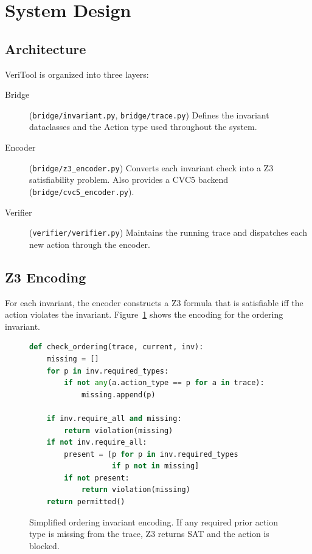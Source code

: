 \documentclass[10pt,twocolumn]{article}
\begin{document}
\section{System Design}
\label{sec:design}

\subsection{Architecture}

VeriTool is organized into three layers:

\begin{description}
\item[Bridge] (\texttt{bridge/invariant.py}, \texttt{bridge/trace.py})
  Defines the invariant dataclasses and the Action type used throughout
  the system.
\item[Encoder] (\texttt{bridge/z3\_encoder.py}) Converts each invariant
  check into a Z3 satisfiability problem. Also provides a CVC5 backend
  (\texttt{bridge/cvc5\_encoder.py}).
\item[Verifier] (\texttt{verifier/verifier.py}) Maintains the running
  trace and dispatches each new action through the encoder.
\end{description}

\subsection{Z3 Encoding}

For each invariant, the encoder constructs a Z3 formula that is satisfiable
iff the action violates the invariant. Figure~\ref{fig:encoding} shows
the encoding for the ordering invariant.

\begin{figure}[t]
\begin{lstlisting}[language=Python]
def check_ordering(trace, current, inv):
    missing = []
    for p in inv.required_types:
        if not any(a.action_type == p for a in trace):
            missing.append(p)

    if inv.require_all and missing:
        return violation(missing)
    if not inv.require_all:
        present = [p for p in inv.required_types
                   if p not in missing]
        if not present:
            return violation(missing)
    return permitted()
\end{lstlisting}
\caption{Simplified ordering invariant encoding.
  If any required prior action type is missing from the trace, Z3
  returns SAT and the action is blocked.}
\label{fig:encoding}
\end{figure}
\end{document}
